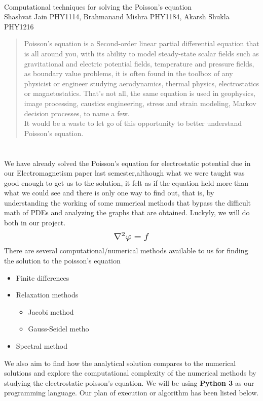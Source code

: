 \documentclass[letterpaper,11pt]{article}
\newcommand{\newsection}[1]{\section{\sffamily{\bfseries{#1}}}}
\begin{document}
	\begin{center}
		 \\[7mm]
		\large{ Computational techniques for solving the Poisson’s equation} \\[7mm]
		\large{\textcolor{greyish}{Shashvat Jain PHY1114, Brahmanand Mishra PHY1184, Akarsh Shukla PHY1216}}
		\begin{abstract}
			\noindent
			Poisson's equation is a Second-order linear partial differential equation that is all around you, with its ability to model steady-state scalar fields such as gravitational and electric potential fields, temperature and pressure fields, as boundary value problems, it is often found in the toolbox of any physicist or engineer studying aerodynamics, thermal physics, electrostatics or magnetostatics. That’s not all, the same equation is used in geophysics, image processing, caustics engineering, stress and strain modeling, Markov decision processes, to name a few.
\\ \noindent
			It would be a waste to let go of this opportunity to better understand Poisson's equation.  
		\end{abstract}	
	\end{center}
	
	\newsection{PROJECT SYNOPSIS}
	\noindent
	We have already solved the Poisson’s equation for electrostatic potential due in our Electromagnetism paper last semester,although what we were taught was good enough to get us to the solution, it felt as if the equation held more than what we could see and there is only one way to find out, that is, by understanding the working of some numerical methods that bypass the difficult math of PDEs and analyzing the graphs that are obtained. Luckyly, we will do both in our project.
	\[
		\scalebox{1.3}{$\nabla^2 \varphi = f$}
	\]
	\noindent
	There are several computational/numerical methods available to us for finding the solution to the poisson's equation 
	\begin{itemize}
		\setlength\itemsep{0.01mm}
		\item Finite differences
		\item  Relaxation methods
		\begin{itemize}
			\item Jacobi method
    
			\item Gauss-Seidel metho 
		\end{itemize}
		\item Spectral method 
 
	\end{itemize}
	\noindent
	We also aim to find how the analytical solution compares to the numerical solutions and explore the computational complexity of the numerical methods by studying the electrostatic poisson’s equation. We will be using \textbf{Python 3} as our programming language. Our plan of execution or algorithm has been listed below. 
	
\end{document}
